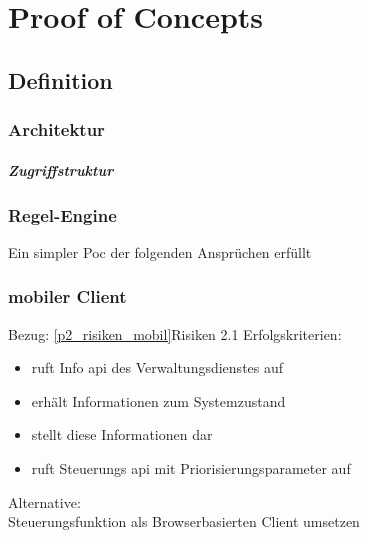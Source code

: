 \chapter{Proof of Concepts}

\begin{comment}
Die Proof of Concepts lassen sich evtl. aus den Risiken ableiten. Für die Spezifizierung der Proof of Concepts müssen jeweils Exit- und Failkriterien beschrieben werden. D.h. es werden konkrete Bedingungen spezifiziert, die besagen in welchem Fall ein Proof of Concept als "erfolgreich" oder als "nicht erfolgreich" gilt. Falls ein Proof of Concept gescheitert ist, muss man sich im Vorfeld Alternativen/Fallbacks überlegen, die anstelle der ursprünglich angedachten Vorgehensweise herangezogen werden könnten. Die Durchführung eines Proof of Concepts muss dokumentiert werden. 
\end{comment}


\section{Definition}


\subsection{Architektur}

\paragraph*{Zugriffstruktur}



\subsection{Regel-Engine}
Ein simpler Poc der folgenden Ansprüchen erfüllt
\begin{enumerate}

\end{enumerate}

%
\subsection{mobiler Client}
%
Bezug: \ref{p2_risiken_mobil}{Risiken 2.1}
Erfolgskriterien:
\begin{itemize}
\item ruft Info api des Verwaltungsdienstes auf
\item erhält Informationen zum Systemzustand\\
\item stellt diese Informationen dar
\item ruft Steuerungs api mit Priorisierungsparameter auf
\end{itemize}
\noindent
Alternative:\\
Steuerungsfunktion als Browserbasierten Client umsetzen

